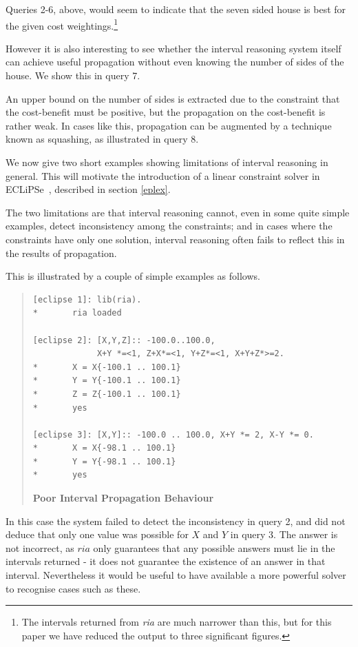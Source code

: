 \documentclass[a4wide]{article}
\newcommand{\ECL}{\mbox{ECLiPSe\ }{\hspace{1mm}}}
\begin{document}
Queries 2-6, above, would seem to indicate
that the seven sided house is best for the given cost
weightings.\footnote{The intervals returned from {\em ria} are much
narrower than this, but for this paper we have reduced the output to
three significant figures.}

However it is also interesting to see whether the interval reasoning
system itself can achieve useful propagation without even knowing the
number of sides of the house.
We show this in query 7.

An upper bound on the number of sides is extracted due to the
constraint that the cost-benefit must be positive,
but the propagation on the cost-benefit is rather weak. 
In cases like this, propagation can be augmented by a technique known
as squashing, as 
illustrated in query 8.

We now give two short examples showing limitations
of interval reasoning in general.
This will motivate the introduction of a linear constraint solver in
\ECL, described in section \ref{eplex}.

The two limitations are that interval reasoning cannot, even in some
quite simple examples, detect inconsistency among the constraints; and
in cases where the constraints have only one solution, interval
reasoning often fails to reflect this in the results of propagation. 

This is illustrated by a couple of simple examples as follows. 
\begin{quote}
\begin{verbatim}
[eclipse 1]: lib(ria).
*       ria loaded

[eclipse 2]: [X,Y,Z]:: -100.0..100.0, 
             X+Y *=<1, Z+X*=<1, Y+Z*=<1, X+Y+Z*>=2.
*       X = X{-100.1 .. 100.1}
*       Y = Y{-100.1 .. 100.1}
*       Z = Z{-100.1 .. 100.1}
*       yes

[eclipse 3]: [X,Y]:: -100.0 .. 100.0, X+Y *= 2, X-Y *= 0.
*       X = X{-98.1 .. 100.1}
*       Y = Y{-98.1 .. 100.1}
*       yes
\end{verbatim}
{\bf Poor Interval Propagation Behaviour}
\label{badria}
\end{quote}
In this case the system failed to detect the
inconsistency in query 2, and did not deduce that only one value
was possible for $X$ and $Y$ in query 3.
The answer is not incorrect, as $ria$ only guarantees that any
possible answers must lie in the intervals returned - it does not
guarantee the existence of an answer in that interval.
Nevertheless it would be useful to have available a more powerful
solver to recognise cases such as these.
\end{document}
